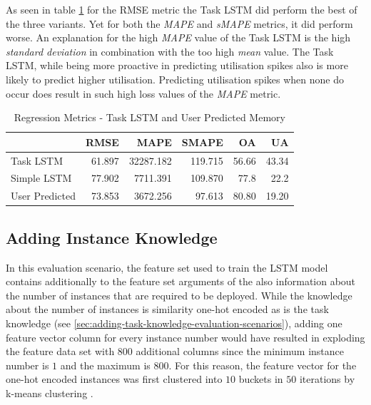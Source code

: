       As seen in table \ref{tab:regression-metrics-task-lstm-user-predicted-memory} for the RMSE metric the Task LSTM did perform the best of the three variants. Yet for both the \emph{MAPE} and \emph{sMAPE} metrics, it did perform worse. An explanation for the high \emph{MAPE} value of the Task LSTM is the high \emph{standard deviation} in combination with the too high \emph{mean} value. The Task LSTM, while being more proactive in predicting utilisation spikes also is more likely to predict higher utilisation. Predicting utilisation spikes when none do occur does result in such high loss values of the \emph{MAPE} metric.
      
      \begin{table}
        \centering
        \caption{Regression Metrics - Task LSTM and User Predicted Memory}
        \label{tab:regression-metrics-task-lstm-user-predicted-memory}
        
        \begin{tabular}{|l|rrrrr|}
          \toprule
          {} &    RMSE &       MAPE &    SMAPE &     OA &     UA \\
          \midrule
          Task LSTM   &  61.897 &  32287.182 &  119.715 &  56.66 &  43.34 \\
          Simple LSTM &  77.902 &  7711.391 &  109.870 &  77.8 &  22.2 \\
          User Predicted &  73.853 &   3672.256 &   97.613 &  80.80 &  19.20 \\
          \bottomrule
        \end{tabular}
      \end{table}

  \subsection{Adding Instance Knowledge}
  \label{sec:adding-instance-knowledge-evaluation-scenarios}

    In this evaluation scenario, the feature set used to train the LSTM model contains additionally to the feature set arguments of the  also information about the number of instances that are required to be deployed. While the knowledge about the number of instances is similarity one-hot encoded as is the task knowledge (see \ref{sec:adding-task-knowledge-evaluation-scenarios}), adding one feature vector column for every instance number would have resulted in exploding the feature data set with 800 additional columns since the minimum instance number is $1$ and the maximum is $800$.
    For this reason, the feature vector for the one-hot encoded instances was first clustered into $10$ buckets in $50$ iterations by k-means clustering \cite{hartiganAlgorithm136Kmeans1979}.


